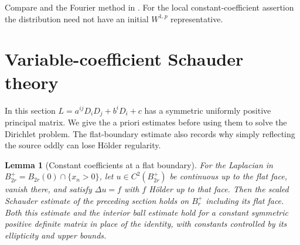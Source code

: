 \documentclass[11pt,oneside,openany]{book}
\theoremstyle{plain}
\newtheorem{lemma}[theorem]{Lemma}
\theoremstyle{definition}
\theoremstyle{remark}
\begin{document}
Compare \cite[Chapter 9]{GT} and the Fourier method in
\cite[Section 4.3.1]{Evans}. For the local constant-coefficient
assertion the distribution need not have an initial \(W^{1,p}\)
representative.

\section{Variable-coefficient Schauder theory}\label{pde:E09}

In this section \(L=a^{ij}D_iD_j+b^iD_i+c\) has a symmetric
uniformly positive principal matrix. We give the a priori
estimates before using them to solve the Dirichlet problem.
The flat-boundary estimate also records why simply reflecting
the source oddly can lose Hölder regularity.

\begin{lemma}[Constant coefficients at a flat boundary]
\label{pde:elliptic-flat-schauder}
For the Laplacian in \(B_{2r}^+=B_{2r}(0)\cap\{x_n>0\}\),
let \(u\in C^2(B_{2r}^+)\) be continuous up to the flat face,
vanish there, and satisfy \(\Delta u=f\) with \(f\) Hölder
up to that face. Then the scaled Schauder estimate of the
preceding section holds on \(B_r^+\) including its flat face.
Both this estimate and the interior ball estimate hold for a
constant symmetric positive definite matrix in place of the
identity, with constants controlled by its ellipticity and
upper bounds.
\end{lemma}
\end{document}
